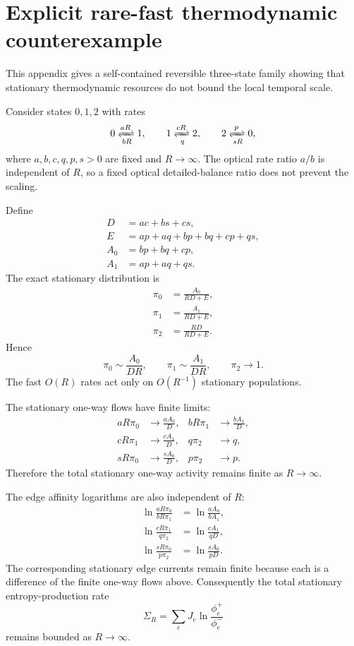 \section{Explicit rare-fast thermodynamic counterexample}
\label{app:rare-fast}

This appendix gives a self-contained reversible three-state family showing that stationary thermodynamic resources do not bound the local temporal scale.

Consider states $0,1,2$ with rates
\begin{equation}
0\xrightleftharpoons[bR]{aR}1,
\qquad
1\xrightleftharpoons[q]{cR}2,
\qquad
2\xrightleftharpoons[sR]{p}0,
\label{eq:rareRates}
\end{equation}
where $a,b,c,q,p,s>0$ are fixed and $R\to\infty$.  The optical rate ratio $a/b$ is independent of $R$, so a fixed optical detailed-balance ratio does not prevent the scaling.

Define
\begin{align}
D&=ac+bs+cs,\\
E&=ap+aq+bp+bq+cp+qs,\\
A_0&=bp+bq+cp,\\
A_1&=ap+aq+qs.
\end{align}
The exact stationary distribution is
\begin{align}
\pi_0&=\frac{A_0}{RD+E},\\
\pi_1&=\frac{A_1}{RD+E},\\
\pi_2&=\frac{RD}{RD+E}.
\end{align}
Hence
\begin{equation}
\pi_0\sim\frac{A_0}{DR},
\qquad
\pi_1\sim\frac{A_1}{DR},
\qquad
\pi_2\to1.
\end{equation}
The fast $O(R)$ rates act only on $O(R^{-1})$ stationary populations.

The stationary one-way flows have finite limits:
\begin{align}
aR\pi_0&\to\frac{aA_0}{D}, &
 bR\pi_1&\to\frac{bA_1}{D},\\
cR\pi_1&\to\frac{cA_1}{D}, &
 q\pi_2&\to q,\\
sR\pi_0&\to\frac{sA_0}{D}, &
 p\pi_2&\to p.
\end{align}
Therefore the total stationary one-way activity remains finite as $R\to\infty$.

The edge affinity logarithms are also independent of $R$:
\begin{align}
\ln\frac{aR\pi_0}{bR\pi_1}
&=\ln\frac{aA_0}{bA_1},\\
\ln\frac{cR\pi_1}{q\pi_2}
&=\ln\frac{cA_1}{qD},\\
\ln\frac{sR\pi_0}{p\pi_2}
&=\ln\frac{sA_0}{pD}.
\end{align}
The corresponding stationary edge currents remain finite because each is a difference of the finite one-way flows above.  Consequently the total stationary entropy-production rate
\begin{equation}
\Sigma_R
=\sum_{e}J_e\ln\frac{\phi_e^+}{\phi_e^-}
\end{equation}
remains bounded as $R\to\infty$.


